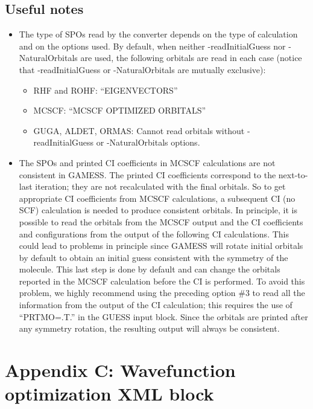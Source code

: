 {\subsection{Useful notes}
\begin{itemize}
  \item{The type of SPOs read by the converter depends on the type of
calculation and on the options used. By default, when neither -readInitialGuess nor
-NaturalOrbitals are used, the following orbitals are read in each case (notice that
-readInitialGuess or -NaturalOrbitals are mutually exclusive):}
  \begin{itemize}
    \item{RHF and ROHF: “EIGENVECTORS”}
    \item{MCSCF: “MCSCF OPTIMIZED ORBITALS”}
    \item{GUGA, ALDET, ORMAS: Cannot read orbitals without -readInitialGuess or -NaturalOrbitals options.}
  \end{itemize}
  \item{The SPOs and printed CI coefficients in MCSCF calculations are
not consistent in GAMESS. The printed CI coefficients correspond to the next-to-last
iteration; they are not recalculated with the final orbitals. So to get appropriate 
CI coefficients from MCSCF calculations, a subsequent CI (no SCF) calculation
is needed to produce consistent orbitals. In principle, it is possible to read the orbitals 
from the MCSCF output and the CI coefficients and configurations from the
output of the following CI calculations. This could lead to problems in principle since
GAMESS will rotate initial orbitals by default to obtain an initial guess consistent 
with the symmetry of the molecule. This last step is done by default and can
change the orbitals reported in the MCSCF calculation before the CI is performed.
To avoid this problem, we highly recommend using the preceding option \#3 to
read all the information from the output of the CI calculation; this requires the use
of “PRTMO=.T.” in the GUESS input block. Since the orbitals are printed after any
symmetry rotation, the resulting output will always be consistent.}
\end{itemize}


\newpage
\section{Appendix C: Wavefunction optimization XML block}\label{sec:lab_adv_mol_opt_appendix}

}
